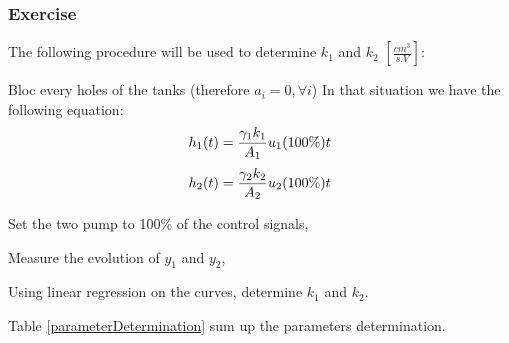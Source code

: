 \subsubsection{Exercise}

The following procedure will be used to determine $k_1$ and $k_2$ $\left[\frac{cm^3}{s.V}\right]$:

\begin{shortitemize}
    \item Bloc every holes of the tanks (therefore $a_i = 0, \forall i$)
        In that situation we have the following equation:
            $$
            h_1(t) = \frac{\gamma_1k_1}{A_1}u_1(100\%)t \\
            $$
            $$
            h_2(t) = \frac{\gamma_2k_2}{A_2}u_2(100\%)t \\
            $$
    \item Set the two pump to 100\% of the control signals,
    \item Measure the evolution of $y_1$ and $y_2$,
    \item Using linear regression on the curves, determine $k_1$ and $k_2$.
\end{shortitemize}

Table \ref{parameterDetermination} sum up the parameters determination.

